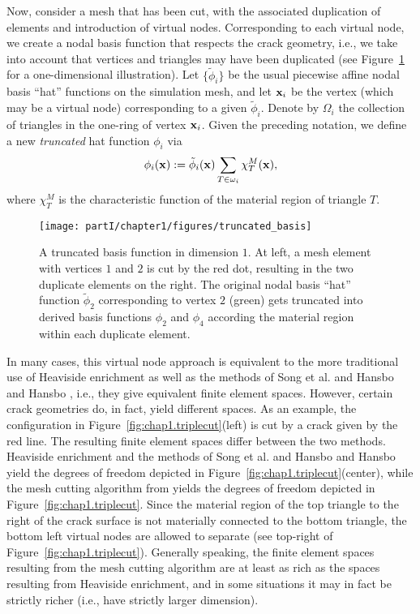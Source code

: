 Now, consider a mesh that has been cut, with the associated duplication of elements and introduction of virtual nodes. Corresponding to each virtual node, we create a nodal basis function that respects the crack geometry, i.e., we take into account that vertices and triangles may have been duplicated (see Figure~\ref{fig:chap1.truncatedbasis} for a one-dimensional illustration). Let $\{\tilde{\phi}_i\}$ be the usual piecewise affine nodal basis ``hat'' functions on the simulation mesh, and let $\mathbf{x}_i$ be the vertex (which may be a virtual node) corresponding to a given $\tilde{\phi}_i$. Denote by $\Omega_i$ the collection of triangles in the one-ring of vertex $\mathbf{x}_i$. Given the preceding notation, we define a new \emph{truncated} hat function $\phi_i$ via
\begin{equation} \label{eq:chap1.truncatedbasis}
\phi_i(\mathbf{x}) := \tilde{\phi}_i(\mathbf{x}) \sum_{T \in \omega_i} \chi_T^M(\mathbf{x}),
\end{equation}
where $\chi_T^M$ is the characteristic function of the material region of triangle $T$.

\setlength{\figurewidth}{\textwidth}
\begin{figure}[htbp]
\centering
\texttt{[image: partI/chapter1/figures/truncated\_basis]}
\caption{A truncated basis function in dimension $1$. At left, a mesh element with vertices $1$ and $2$ is cut by the red dot, resulting in the two duplicate elements on the right. The original nodal basis ``hat'' function $\tilde{\phi}_2$ corresponding to vertex $2$ (green) gets truncated into derived basis functions $\phi_2$ and $\phi_4$ according the material region within each duplicate element.}
\label{fig:chap1.truncatedbasis}
\end{figure}

In many cases, this virtual node approach is equivalent to the more traditional use of Heaviside enrichment as well as the methods of Song et al. \cite{Song06} and Hansbo and Hansbo \cite{Hansbo04}, i.e., they give equivalent finite element spaces. However, certain crack geometries do, in fact, yield different spaces. As an example, the configuration in Figure~\ref{fig:chap1.triplecut}(left) is cut by a crack given by the red line. The resulting finite element spaces differ between the two methods. Heaviside enrichment and the methods of Song et al. \cite{Song06} and Hansbo and Hansbo \cite{Hansbo04} yield the degrees of freedom depicted in Figure~\ref{fig:chap1.triplecut}(center), while the mesh cutting algorithm from \cite{Sifakis07} yields the degrees of freedom depicted in Figure~\ref{fig:chap1.triplecut}. Since the material region of the top triangle to the right of the crack surface is not materially connected to the bottom triangle, the bottom left virtual nodes are allowed to separate (see top-right of Figure~\ref{fig:chap1.triplecut}). Generally speaking, the finite element spaces resulting from the mesh cutting algorithm are at least as rich as the spaces resulting from Heaviside enrichment, and in some situations it may in fact be strictly richer (i.e., have strictly larger dimension).

